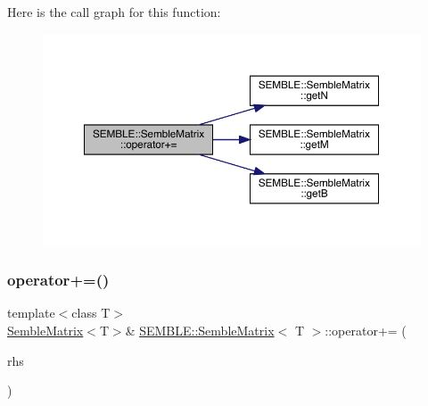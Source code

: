 Here is the call graph for this function\+:
\nopagebreak
\begin{figure}[H]
\begin{center}
\leavevmode
\includegraphics[width=350pt]{df/d87/structSEMBLE_1_1SembleMatrix_a5936a2f5446365cd0eafb0ede754d392_cgraph}
\end{center}
\end{figure}
\mbox{\label{structSEMBLE_1_1SembleMatrix_a76423cb9bf22b03e432cf612f395c404}} 
\subsubsection{\texorpdfstring{operator+=()}{operator+=()}\hspace{0.1cm}{\footnotesize\ttfamily [2/4]}}
{\footnotesize\ttfamily template$<$class T$>$ \\
\mbox{\hyperlink{structSEMBLE_1_1SembleMatrix}{Semble\+Matrix}}$<$T$>$\& \mbox{\hyperlink{structSEMBLE_1_1SembleMatrix}{S\+E\+M\+B\+L\+E\+::\+Semble\+Matrix}}$<$ T $>$\+::operator+= (\begin{DoxyParamCaption}\item[{const \mbox{\hyperlink{structSEMBLE_1_1SembleMatrix}{Semble\+Matrix}}$<$ T $>$ \&}]{rhs }\end{DoxyParamCaption})}

\mbox{\label{structSEMBLE_1_1SembleMatrix_a0196369ecba26c3cf14d9741d49de9d0}} 
